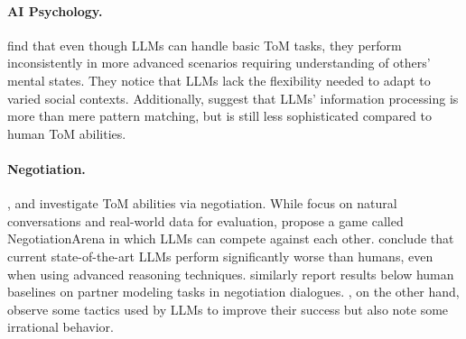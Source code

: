 \paragraph{AI Psychology.} \citet{li2024quantifyingaipsychologypsychometrics} find that even though LLMs can handle basic ToM tasks, they perform inconsistently in more advanced scenarios requiring understanding of others' mental states. They notice that LLMs lack the flexibility needed to adapt to varied social contexts. Additionally, \citet{pi2024dissectingullmanvariationsscalpel} suggest that LLMs' information processing is more than mere pattern matching, but is still less sophisticated compared to human ToM abilities.

\paragraph{Negotiation.} \citet{chan2024negotiationtombenchmarkstresstestingmachine}, \citet{bianchi2024llmsnegotiatenegotiationarenaplatform} and \citet{kwon2024llmseffectivenegotiatorssystematic} investigate ToM abilities via negotiation. While \citet{chan2024negotiationtombenchmarkstresstestingmachine} focus on natural conversations and real-world data for evaluation, \citet{bianchi2024llmsnegotiatenegotiationarenaplatform} propose a game called NegotiationArena in which LLMs can compete against each other. \citet{chan2024negotiationtombenchmarkstresstestingmachine} conclude that current state-of-the-art LLMs perform significantly worse than humans, even when using advanced reasoning techniques. \citet{kwon2024llmseffectivenegotiatorssystematic} similarly report results below human baselines on partner modeling tasks in negotiation dialogues. \citet{bianchi2024llmsnegotiatenegotiationarenaplatform}, on the other hand, observe some tactics used by LLMs to improve their success but also note some irrational behavior.

